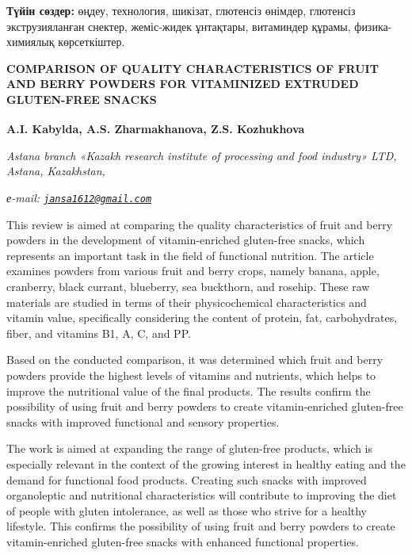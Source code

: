 {\bfseries Түйін сөздер:} өңдеу, технология, шикізат, глютенсіз өнімдер,
глютенсіз экструзияланған снектер, жеміс-жидек ұнтақтары, витаминдер
құрамы, физика-химиялық көрсеткіштер.

\begin{articleheader}
{\bfseries COMPARISON OF QUALITY CHARACTERISTICS OF FRUIT AND BERRY POWDERS FOR VITAMINIZED EXTRUDED GLUTEN-FREE SNACKS}

{\bfseries
A.I. Kabylda,
A.S. Zharmakhanova,
Z.S. Kozhukhova\textsuperscript{\envelope }}
\end{articleheader}

\begin{affiliation}
\emph{Astana branch «Kazakh research institute of processing and food industry» LTD, Astana, Kazakhstan,}

\emph{е-mail: \href{mailto:jansa1612@gmail.com}{\nolinkurl{jansa1612@gmail.com}}}
\end{affiliation}

This review is aimed at comparing the quality characteristics of fruit
and berry powders in the development of vitamin-enriched gluten-free
snacks, which represents an important task in the field of functional
nutrition. The article examines powders from various fruit and berry
crops, namely banana, apple, cranberry, black currant, blueberry, sea
buckthorn, and rosehip. These raw materials are studied in terms of
their physicochemical characteristics and vitamin value, specifically
considering the content of protein, fat, carbohydrates, fiber, and
vitamins B1, A, C, and PP.

Based on the conducted comparison, it was determined which fruit and
berry powders provide the highest levels of vitamins and nutrients,
which helps to improve the nutritional value of the final products. The
results confirm the possibility of using fruit and berry powders to
create vitamin-enriched gluten-free snacks with improved functional and
sensory properties.

The work is aimed at expanding the range of gluten-free products, which
is especially relevant in the context of the growing interest in healthy
eating and the demand for functional food products. Creating such snacks
with improved organoleptic and nutritional characteristics will
contribute to improving the diet of people with gluten intolerance, as
well as those who strive for a healthy lifestyle. This confirms the
possibility of using fruit and berry powders to create vitamin-enriched
gluten-free snacks with enhanced functional properties.

